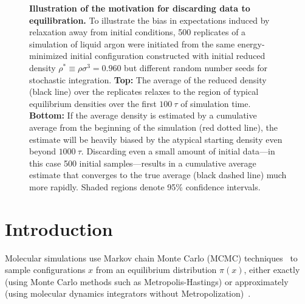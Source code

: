 \documentclass[aps,pre,twocolumn,nofootinbib,superscriptaddress,linenumbers,11point]{revtex4-1}
\begin{document}
\begin{figure}[tbp]
\caption{\label{figure:burn-in-example} {\bf Illustration of the motivation for discarding data to equilibration.} 
To illustrate the bias in expectations induced by relaxation away from initial conditions, 500 replicates of a simulation of liquid argon were initiated from the same energy-minimized initial configuration constructed with initial reduced density $\rho^* \equiv \rho \sigma^3 = 0.960$ but different random number seeds for stochastic integration.
%
{\bf Top:} The average of the reduced density (black line) over the replicates relaxes to the region of typical equilibrium densities over the first $100~\tau$ of simulation time.
%
{\bf Bottom:} If the average density is estimated by a cumulative average from the beginning of the simulation (red dotted line), the estimate will be heavily biased by the atypical starting density even beyond $1000~\tau$.
Discarding even a small amount of initial data---in this case 500 initial samples---results in a cumulative average estimate that converges to the true average (black dashed line) much more rapidly.
% 
Shaded regions denote 95\% confidence intervals.
}
\end{figure}


\section*{Introduction}
\label{section:introduction}

Molecular simulations use Markov chain Monte Carlo (MCMC) techniques~\cite{jun-s-liu:mcmc} to sample configurations $x$ from an equilibrium distribution $\pi(x)$, either exactly (using Monte Carlo methods such as Metropolis-Hastings) or approximately (using molecular dynamics integrators without Metropolization)~\cite{sivak:2013:prx:vvvr}.
\end{document}

